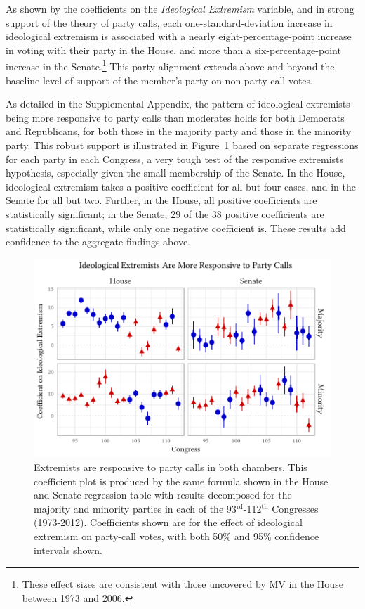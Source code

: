 \documentclass[12pt]{article}
\begin{document}
As shown by the coefficients on the \textit{Ideological Extremism} variable, and in strong support of the theory of party calls, each one-standard-deviation increase in ideological extremism is associated with a nearly eight-percentage-point increase in voting with their party in the House, and more than a six-percentage-point increase in the Senate.\footnote{\doublespacing\normalsize These effect sizes are consistent with those uncovered by MV in the House between 1973 and 2006.} This party alignment extends above and beyond the baseline level of support of the member's party on non-party-call votes.

As detailed in the Supplemental Appendix, the pattern of ideological extremists being more responsive to party calls than moderates holds for both Democrats and Republicans, for both those in the majority party and those in the minority party. This robust support is illustrated in Figure~\ref{fig-extremism-responsiveness} based on separate regressions for each party in each Congress, a very tough test of the responsive extremists hypothesis, especially given the small membership of the Senate. In the House, ideological extremism takes a positive coefficient for all but four cases, and in the Senate for all but two. Further, in the House, all positive coefficients are statistically significant; in the Senate, 29 of the 38 positive coefficients are statistically significant, while only one negative coefficient is. These results add confidence to the aggregate findings above.

\begin{figure}[!htbp]
\centering
\includegraphics{both-chambers-figure2.pdf}
\caption{Extremists are responsive to party calls in both chambers.
This coefficient plot is produced by the same formula shown in the House and Senate regression table with results decomposed for the majority and minority parties in each of the 93$^{\text{rd}}$-112$^{\text{th}}$ Congresses (1973-2012). Coefficients shown are for the effect of ideological extremism on party-call votes, with both 50\% and 95\% confidence intervals shown.
\label{fig-extremism-responsiveness}}
\end{figure}
\end{document}
